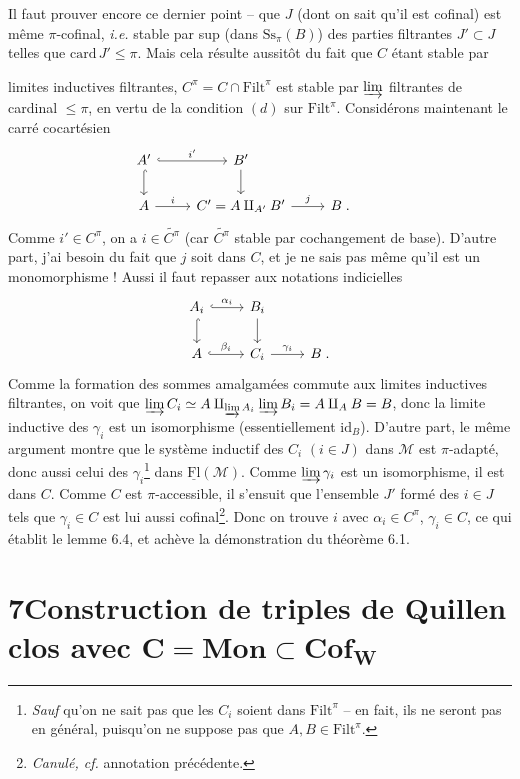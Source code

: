 \documentclass[11pt]{article}
\newcommand{\msp}[1]{\marginpar{\footnotesize [#1]}}
\newcommand{\Filt}{\mathrm{Filt}}
\newcommand{\Ss}{\mathrm{Ss}}
\newcommand{\M}{\mathcal{M}}
\newcommand{\Fl}{\mathrm{Fl}}
\begin{document}
Il faut prouver encore ce dernier point -- que $J$ (dont on sait qu'il est cofinal) est même $\pi$-cofinal, \textit{i.e.} stable par sup (dans $\Ss_{\pi}(B)$) des parties filtrantes $J' \subset J$ telles que $\mathrm{card}\, J' \leq \pi$. Mais cela résulte aussitôt du fait que $C$ étant stable par

\msp{page 83}
limites inductives filtrantes, $C^{\pi} = C \cap \Filt^{\pi}$ est stable par $\varinjlim$ filtrantes de cardinal $\leq \pi$, en vertu de la condition $(d)$ sur $\Filt^{\pi}$. Considérons maintenant le carré cocartésien
\[
\begin{tikzcd}
A' \arrow[r, hook, "i'"] \arrow[d, hook] & B' \arrow[d] & & \\
A \arrow[r, "i"] & C' = A \amalg_{A'} B' \arrow[r, "j"] & B \;.
\end{tikzcd}
\]
Comme $i' \in C^{\pi}$, on a $i \in \widetilde{C^{\pi}}$ (car $\widetilde{C^{\pi}}$ stable par cochangement de base). D'autre part, j'ai besoin du fait que $j$ soit dans $C$, et je ne sais pas même qu'il est un monomorphisme ! Aussi il faut repasser aux notations indicielles
\[
\begin{tikzcd}
A_i \arrow[r, hook, "\alpha_i"] \arrow[d, hook] & B_i \arrow[d] & \\
A \arrow[r, hook, "\beta_i"] & C_i \arrow[r, "\gamma_i"] & B \;.
\end{tikzcd}
\]
Comme la formation des sommes amalgamées commute aux limites inductives filtrantes, on voit que $\varinjlim C_i \simeq A \amalg_{\varinjlim A_i} \varinjlim B_i = A \amalg_A B = B$, donc la limite inductive des $\gamma_i$ est un isomorphisme (essentiellement $\mathrm{id}_B$). D'autre part, le même argument montre que le système inductif des $C_i$ $(i \in J)$ dans $\M$ est $\pi$-adapté, donc aussi celui des $\gamma_i$\footnote[28]{\textit{Sauf} qu'on ne sait pas que les $C_i$ soient dans $\Filt^{\pi}$ -- en fait, ils ne seront pas en général, puisqu'on ne suppose pas que $A, B \in \Filt^{\pi}$.}
\msp{page 84}
dans $\underline{\Fl}(\M)$. Comme $\varinjlim \gamma_i$ est un isomorphisme, il est dans $C$. Comme $C$ est $\pi$-accessible, il s'ensuit que l'ensemble $J'$ formé des $i \in J$ tels que $\gamma_i \in C$ est lui aussi cofinal\footnote[29]{\textit{Canulé, cf.} annotation précédente.}. Donc on trouve $i$ avec $\alpha_i \in C^{\pi}$, $\gamma_i \in C$, ce qui établit le lemme 6.4, et achève la démonstration du théorème 6.1.

\section*{7\quad Construction de triples de Quillen clos avec $\boldsymbol{C} = \mathbf{Mon} \subset \mathbf{Cof}_{\boldsymbol{W}}$}
\end{document}

